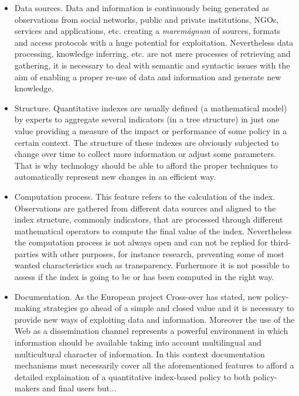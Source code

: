 \documentclass{llncs}
\begin{document}
\begin{itemize}
 \item Data sources. Data and information is continuously being generated as observations from social networks, public and private institutions, NGOs, services and applications, etc. 
 creating  a \textit{marem\'{a}gnum} of sources, formats and access protocols with a huge potential for exploitation. Nevertheless data processing, knowledge inferring, etc. are not mere processes 
 of retrieving and gathering, it is necessary to deal with semantic and syntactic issues with the aim of enabling a proper re-use of data and information 
 and generate new knowledge. 
 
 \item Structure. Quantitative indexes are usually defined (a mathematical model) by experts to aggregate several indicators (in a tree structure) in just one value providing 
 a measure of the impact or performance of some policy in a certain context. The structure of these indexes are obviously subjected to change over time 
 to collect more information or adjust some parameters. That is why technology should be able to afford the proper techniques 
 to automatically represent new changes in an efficient way.
 
  \item Computation process. This feature refers to the calculation of the index. Observations are gathered from different data sources and aligned 
  to the index structure, commonly indicators, that are processed through different mathematical operators to compute the final value of the index. 
  Nevertheless the computation process is not always open and can not be replied for third-parties with other purposes, for instance research, preventing some 
  of most wanted characteristics such as transparency. Furhermore it is not possible to assess if the index is going to be or has been computed in 
  the right way.
  
  \item Documentation. As the European project Cross-over has stated, new policy-making strategies go ahead of a simple and closed value and it is necessary to provide 
  new ways of exploiting data and information. Moreover the use of the Web as a dissemination channel represents a powerful environment in which 
  information should be available taking into account multilingual and multicultural character of information. In this context documentation mechanisms 
  must necessarily cover all the aforementioned features to afford a detailed explaination of a quantitative index-based policy to both policy-makers 
  and final users but...
\end{itemize}
\end{document}
